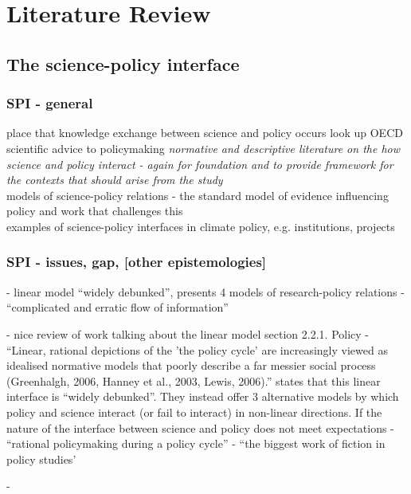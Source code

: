 \chapter{Literature Review}\label{ch:lit}

\section{The science-policy interface}\label{sec:litspi}
\subsection{SPI - general}
place that knowledge exchange between science and policy occurs
look up OECD scientific advice to policymaking
\emph{normative and descriptive literature on the how science and policy interact - again for foundation and to provide framework for the contexts that should arise from the study}\\
models of science-policy relations - the standard model of evidence influencing policy and work that challenges this\\
examples of science-policy interfaces in climate policy, e.g. institutions, projects
\subsection{SPI - issues, gap, [other epistemologies]}
\cite{BoswellS2017} - linear model ``widely debunked'', presents 4 models of research-policy relations
\cite{BednarekSHG2015} - ``complicated and erratic flow of information''

\cite{McNie2007} - nice review of work talking about the linear model section 2.2.1. Policy
\cite{HaynesDCRHGS2011} - ``Linear, rational depictions of the 'the policy cycle' are increasingly viewed as idealised normative models that poorly describe a far messier social process (Greenhalgh, 2006, Hanney et al., 2003, Lewis, 2006).''
\textcite{BoswellS2017} states that this linear  interface is ``widely debunked''. They instead offer 3 alternative models by which policy and science interact (or fail to interact) in non-linear directions. If the nature of the interface between science and policy does not meet expectations 
\cite{Cairney2018} - ``rational policymaking during a policy cycle'' - ``the biggest work of fiction in policy studies'

\cite{IbarraJOBCIMRS2022} - 


